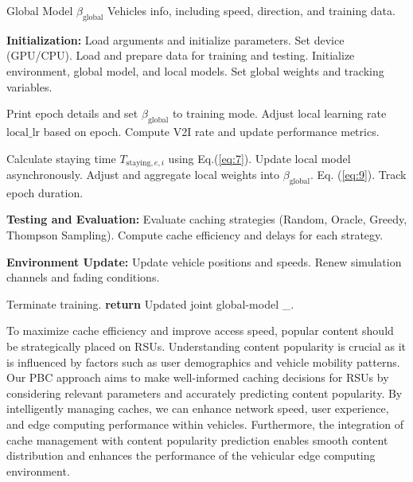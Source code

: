 \documentclass[journal]{IEEEtran}
\begin{document}
\begin{algorithm}
\caption{Global Model Update with Vehicle Data}
\label{alg:global_model_update}
\begin{algorithmic}[1]
\REQUIRE Global Model $\beta_{\text{global}}$ Vehicles info, including speed, direction, and training data.

\STATE \textbf{Initialization:} Load arguments and initialize parameters.
\STATE Set device (GPU/CPU).
\STATE Load and prepare data for training and testing.
\STATE Initialize environment, global model, and local models.
\STATE Set global weights and tracking variables.

    \STATE Print epoch details and set $\beta_{\text{global}}$ to training mode.
    \STATE Adjust local learning rate $\text{local\_lr}$ based on epoch.
    \STATE Compute V2I rate and update performance metrics.
    
        \STATE Calculate staying time $T_{\text{staying}, e, i}$ using Eq.(\ref{eq:7}).
            \STATE Update local model asynchronously.
            \STATE Adjust and aggregate local weights into $\beta_{\text{global}}$. Eq. (\ref{eq:9}).
            \STATE Track epoch duration.
        \ENDIF
    \ENDFOR
\ENDFOR

    \STATE \textbf{Testing and Evaluation:} Evaluate caching strategies (Random, Oracle, Greedy, Thompson Sampling).
    \STATE Compute cache efficiency and delays for each strategy.
\ENDIF

\STATE \textbf{Environment Update:} Update vehicle positions and speeds. Renew simulation channels and fading conditions.

    \STATE Terminate training.
\ENDIF
\STATE \textbf{return} Updated joint global-model \beta_{}.

\end{algorithmic}
\end{algorithm}
To maximize cache efficiency and improve access speed, popular content should be strategically placed on RSUs. Understanding content popularity is crucial as it is influenced by factors such as user demographics and vehicle mobility patterns. Our PBC approach aims to make well-informed caching decisions for RSUs by considering relevant parameters and accurately predicting content popularity. By intelligently managing caches, we can enhance network speed, user experience, and edge computing performance within vehicles. Furthermore, the integration of cache management with content popularity prediction enables smooth content distribution and enhances the performance of the vehicular edge computing environment.
\end{document}

